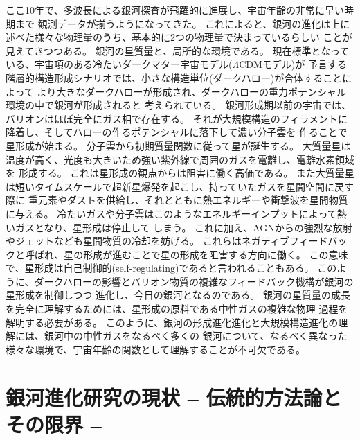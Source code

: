 ここ10年で、多波長による銀河探査が飛躍的に進展し、宇宙年齢の非常に早い時期まで
観測データが揃うようになってきた。
これによると、銀河の進化は上に述べた様々な物理量のうち、基本的に2つの物理量で決まっているらしい
ことが見えてきつつある。
銀河の星質量と、局所的な環境である。
現在標準となっている、宇宙項のある冷たいダークマター宇宙モデル($\Lambda$CDMモデル)が
予言する階層的構造形成シナリオでは、小さな構造単位(ダークハロー)が合体することによって
より大きなダークハローが形成され、ダークハローの重力ポテンシャル環境の中で銀河が形成されると
考えられている。
銀河形成期以前の宇宙では、バリオンはほぼ完全にガス相で存在する。
それが大規模構造のフィラメントに降着し、そしてハローの作るポテンシャルに落下して濃い分子雲を
作ることで星形成が始まる。
分子雲から初期質量関数に従って星が誕生する。
大質量星は温度が高く、光度も大きいため強い紫外線で周囲のガスを電離し、電離水素領域を
形成する。
これは星形成の観点からは阻害に働く高価である。
また大質量星は短いタイムスケールで超新星爆発を起こし、持っていたガスを星間空間に戻す際に
重元素やダストを供給し、それとともに熱エネルギーや衝撃波を星間物質に与える。
冷たいガスや分子雲はこのようなエネルギーインプットによって熱いガスとなり、星形成は停止して
しまう。
これに加え、AGNからの強烈な放射やジェットなども星間物質の冷却を妨げる。
これらはネガティブフィードバックと呼ばれ、星の形成が進むことで星の形成を阻害する方向に働く。
この意味で、星形成は自己制御的(self-regulating)であると言われることもある。
このように、ダークハローの影響とバリオン物質の複雑なフィードバック機構が銀河の星形成を制御しつつ
進化し、今日の銀河となるのである。
銀河の星質量の成長を完全に理解するためには、星形成の原料である中性ガスの複雑な物理
過程を解明する必要がある。
このように、銀河の形成進化進化と大規模構造進化の理解には、銀河中の中性ガスをなるべく多くの
銀河について、なるべく異なった様々な環境で、宇宙年齢の関数として理解することが不可欠である。

\section{銀河進化研究の現状 -- 伝統的方法論とその限界 --}\label{galaxy.s0.5}

